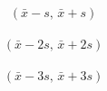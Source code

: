 \documentclass[12pt]{article}
\begin{document}
\pagestyle{empty}
\large
{}
\pagecolor{ehandbook}


\hspace{-1.75in}


\begin{eqnarray*}
(\bar{x}-s, \, \bar{x}+s) 
\end{eqnarray*}

\begin{eqnarray*}
(\bar{x}-2s, \, \bar{x}+2s) 
\end{eqnarray*}

\begin{eqnarray*}
(\bar{x}-3s, \, \bar{x}+3s) 
\end{eqnarray*} 
\end{document}
